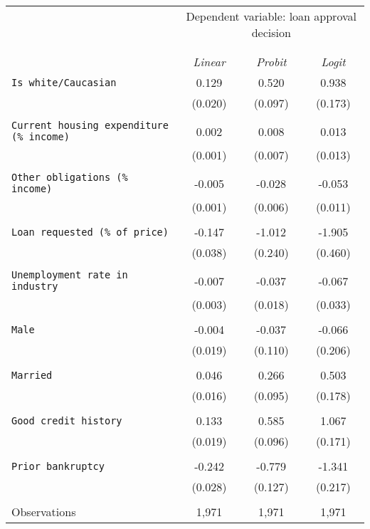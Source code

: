 \begin{attachment}
  \begin{tabular}{lccc}
  \toprule
    & \multicolumn{3}{c}{Dependent variable: loan approval decision} \\
    \cline{2-4} \\
    \\[-3ex]& \textit{Linear} & \textit{Probit} & \textit{Logit} \\
  \midrule
   \texttt{Is white/Caucasian} & 0.129& 0.520 & 0.938 \\ 
    & (0.020) & (0.097) & (0.173) \\ 
    & & & \\ 
   \texttt{Current housing expenditure (\% income)} & 0.002 & 0.008 & 0.013 \\ 
    & (0.001) & (0.007) & (0.013) \\ 
    & & & \\ 
   \texttt{Other obligations (\% income)} & -0.005 & -0.028 & -0.053\\ 
    & (0.001) & (0.006) & (0.011) \\ 
    & & & \\ 
   \texttt{Loan requested (\% of price)} & -0.147 & -1.012 & -1.905 \\ 
    & (0.038) & (0.240) & (0.460) \\ 
    & & & \\ 
   \texttt{Unemployment rate in industry} & -0.007 & -0.037 & -0.067 \\ 
    & (0.003) & (0.018) & (0.033) \\ 
    & & & \\ 
   \texttt{Male} & -0.004 & -0.037 & -0.066 \\ 
    & (0.019) & (0.110) & (0.206) \\ 
    & & & \\ 
   \texttt{Married} & 0.046 & 0.266 & 0.503 \\ 
    & (0.016) & (0.095) & (0.178) \\ 
    & & & \\ 
   \texttt{Good credit history} & 0.133 & 0.585 & 1.067 \\ 
    & (0.019) & (0.096) & (0.171) \\ 
    & & & \\ 
   \texttt{Prior bankruptcy} & -0.242 & -0.779 & -1.341 \\ 
    & (0.028) & (0.127) & (0.217) \\ 
    & & & \\ 
  \midrule
  Observations & \multicolumn{1}{c}{1,971} & \multicolumn{1}{c}{1,971} & \multicolumn{1}{c}{1,971} \\ 

\end{tabular}
\end{attachment}
